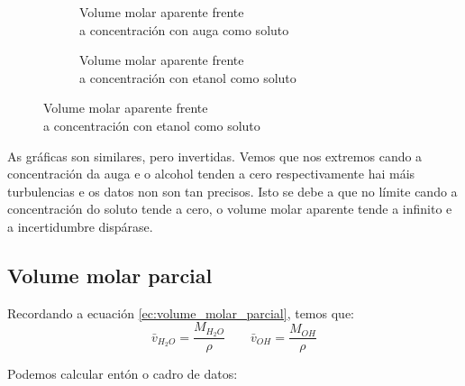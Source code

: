 \documentclass[12pt, a4paper, titlepage]{article}
\begin{document}
  \begin{figure}[H]
    \centering
    \begin{minipage}[c]{0,49\textwidth}
      \begin{figure}[H]
        \hspace{-26pt}
        \resizebox{1,05\textwidth}{!}{
        }
        \caption{Volume molar aparente frente \\ a concentración con auga como soluto}
        \label{fig:vah2o}
      \end{figure}
    \end{minipage}
    \begin{minipage}[c]{0,49\textwidth}
      \begin{figure}[H]
        \hspace{-26pt}
        \resizebox{1,05\textwidth}{!}{
        }
        \caption{Volume molar aparente frente \\ a concentración con etanol como soluto}
        \label{fig:vaoh}
      \end{figure}
    \end{minipage}
  \end{figure}

  As gráficas son similares, pero invertidas. Vemos que nos extremos cando a concentración da auga e o alcohol tenden a cero respectivamente hai máis turbulencias e os datos non son tan precisos. Isto se debe a que no límite cando a concentración do soluto tende a cero, o volume molar aparente tende a infinito e a incertidumbre dispárase.

  \subsection{Volume molar parcial}
  \label{sec:v_parcial}

  Recordando a ecuación \ref{ec:volume_molar_parcial}, temos que:
  \begin{equation*}
    \bar{v}_{H_2O} = \frac{M_{H_2O}}{\rho} \qquad \bar{v}_{OH} = \frac{M_{OH}}{\rho}
  \end{equation*}

  Podemos calcular entón o cadro de datos:
\end{document}
